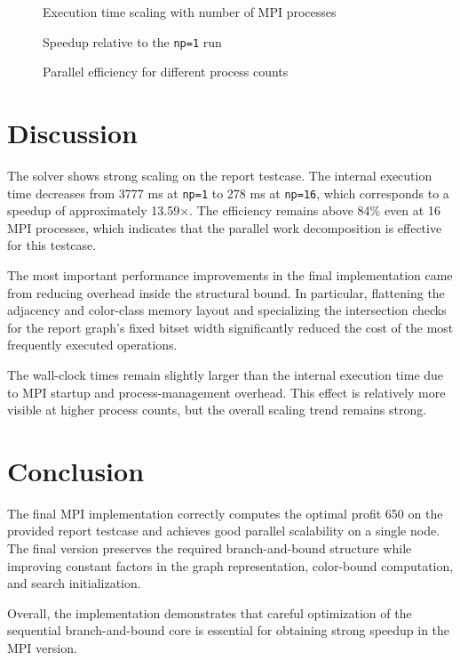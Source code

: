 \documentclass[11pt,a4paper]{article}
\begin{document}
\begin{figure}[H]
    \centering
    
    \caption{Execution time scaling with number of MPI processes}
\end{figure}

\begin{figure}[H]
    \centering
    
    \caption{Speedup relative to the \texttt{np=1} run}
\end{figure}

\begin{figure}[H]
    \centering
    
    \caption{Parallel efficiency for different process counts}
\end{figure}

\section{Discussion}
The solver shows strong scaling on the report testcase. The internal execution time decreases from 3777 ms at \texttt{np=1} to 278 ms at \texttt{np=16}, which corresponds to a speedup of approximately 13.59$\times$. The efficiency remains above 84\% even at 16 MPI processes, which indicates that the parallel work decomposition is effective for this testcase.

The most important performance improvements in the final implementation came from reducing overhead inside the structural bound. In particular, flattening the adjacency and color-class memory layout and specializing the intersection checks for the report graph's fixed bitset width significantly reduced the cost of the most frequently executed operations.

The wall-clock times remain slightly larger than the internal execution time due to MPI startup and process-management overhead. This effect is relatively more visible at higher process counts, but the overall scaling trend remains strong.

\section{Conclusion}
The final MPI implementation correctly computes the optimal profit 650 on the provided report testcase and achieves good parallel scalability on a single node. The final version preserves the required branch-and-bound structure while improving constant factors in the graph representation, color-bound computation, and search initialization.

Overall, the implementation demonstrates that careful optimization of the sequential branch-and-bound core is essential for obtaining strong speedup in the MPI version.
\end{document}
